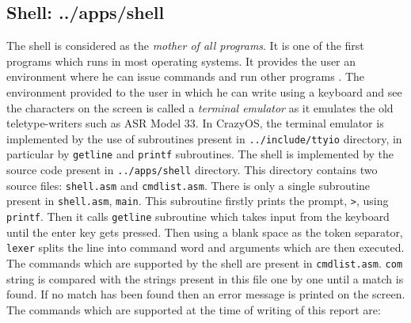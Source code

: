 \subsection{Shell: ../apps/shell}
The shell is considered as the \textit{mother of all programs}. It is one of the first programs which runs in most operating systems. It provides the user an environment where he can issue commands and run other programs \cite{torvalds2001just}. The environment provided to the user in which he can write using a keyboard and see the characters on the screen is called a \textit{terminal emulator} as it emulates the old teletype-writers such as ASR Model 33. In CrazyOS, the terminal emulator is implemented by the use of subroutines present in \texttt{../include/ttyio} directory, in particular by \texttt{getline} and \texttt{printf} subroutines. The shell is implemented by the source code present in \texttt{../apps/shell} directory. This directory contains two source files: \texttt{shell.asm} and \texttt{cmdlist.asm}. There is only a single subroutine present in \texttt{shell.asm}, \texttt{main}. This subroutine firstly prints the prompt, \texttt{>}, using \texttt{printf}. Then it calls \texttt{getline} subroutine which takes input from the keyboard until the enter key gets pressed. Then using a blank space as the token separator, \texttt{lexer} splits the line into command word and arguments which are then executed.\\
The commands which are supported by the shell are present in \texttt{cmdlist.asm}. \texttt{com} string is compared with the strings present in this file one by one until a match is found. If no match has been found then an error message is printed on the screen. The commands which are supported at the time of writing of this report are:
